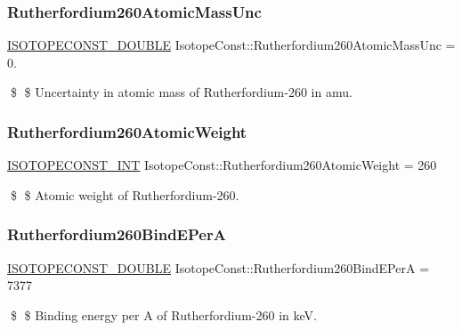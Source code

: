 \subsubsection{\texorpdfstring{Rutherfordium260\+Atomic\+Mass\+Unc}{Rutherfordium260AtomicMassUnc}}
{\footnotesize\ttfamily \mbox{\hyperlink{group___isotope_const-_macros_ga8f45a7272ce02c0b4c65c44636ed719a}{I\+S\+O\+T\+O\+P\+E\+C\+O\+N\+S\+T\+\_\+\+D\+O\+U\+B\+LE}} Isotope\+Const\+::\+Rutherfordium260\+Atomic\+Mass\+Unc = 0.}

\$ \$ Uncertainty in atomic mass of Rutherfordium-\/260 in amu. \mbox{\label{group___isotope_const-_rutherfordium-_rf260_ga6acfda9b4aa70b3d69b8c2a0c9169112}} 
\subsubsection{\texorpdfstring{Rutherfordium260\+Atomic\+Weight}{Rutherfordium260AtomicWeight}}
{\footnotesize\ttfamily \mbox{\hyperlink{group___isotope_const-_macros_ga5f18360b3e99483a35c32d789e62621c}{I\+S\+O\+T\+O\+P\+E\+C\+O\+N\+S\+T\+\_\+\+I\+NT}} Isotope\+Const\+::\+Rutherfordium260\+Atomic\+Weight = 260}

\$ \$ Atomic weight of Rutherfordium-\/260. \mbox{\label{group___isotope_const-_rutherfordium-_rf260_ga2e409920ec76d98d62081924235d19e1}} 
\subsubsection{\texorpdfstring{Rutherfordium260\+Bind\+E\+PerA}{Rutherfordium260BindEPerA}}
{\footnotesize\ttfamily \mbox{\hyperlink{group___isotope_const-_macros_ga8f45a7272ce02c0b4c65c44636ed719a}{I\+S\+O\+T\+O\+P\+E\+C\+O\+N\+S\+T\+\_\+\+D\+O\+U\+B\+LE}} Isotope\+Const\+::\+Rutherfordium260\+Bind\+E\+PerA = 7377}

\$ \$ Binding energy per A of Rutherfordium-\/260 in keV. \mbox{\label{group___isotope_const-_rutherfordium-_rf260_ga3f9435764bd2bf4141b3b93a45b87ce4}} 
